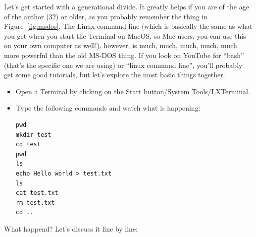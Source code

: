 \documentclass[a4paper,12pt]{book}
\renewcommand{\texttt}[1]{%
  \begingroup
  \ttfamily
  \begingroup\lccode`~=`/\lowercase{\endgroup\def~}{/\discretionary{}{}{}}%
  \begingroup\lccode`~=`[\lowercase{\endgroup\def~}{[\discretionary{}{}{}}%
  \begingroup\lccode`~=`.\lowercase{\endgroup\def~}{.\discretionary{}{}{}}%
  \begingroup\lccode`~=`(\lowercase{\endgroup\def~}{(\discretionary{}{}{}}%
  \catcode`/=\active\catcode`[=\active\catcode`.=\active\catcode`(=\active
  \scantokens{#1\noexpand}%
  \endgroup
}
\begin{document}
 Let’s get started with a generational divide. It greatly helps if you are of the age of the author (32) or older, as you probably remember the thing in Figure~\ref{fig:msdos}. The Linux command line (which is basically the same as what you get when you start the Terminal on MacOS, so Mac users, you can use this on your own computer as well!), however, is much, much, much, much, much more powerful than the old MS-DOS thing. If you look on YouTube for ``bash'' (that's the specific one we are using) or ``linux command line'', you'll probably get some good tutorials, but let's explore the most basic things together.
 \begin{itemize}
 \item Open a Terminal by clicking on the Start button/System Tools/LXTerminal.
 \item Type the following commands and watch what is happening: \begin{lstlisting}
pwd
mkdir test
cd test
pwd
ls
echo Hello world > test.txt
ls
cat test.txt
rm test.txt
cd ..
 \end{lstlisting}
\end{itemize}
What happend? Let's discuss it line by line:
 
\end{document}

